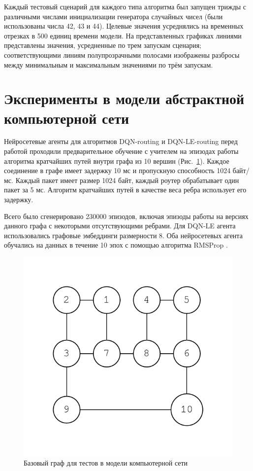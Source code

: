 \documentclass[specification,annotation,times]{itmo-student-thesis}
\theoremstyle{definition}
\begin{document}
Каждый тестовый сценарий для каждого типа алгоритма был запущен трижды с
различными числами инициализации генератора случайных чисел (были использованы
числа 42, 43 и 44). Целевые значения усреднялись на временных отрезках в 500
единиц времени модели. На представленных графиках линиями представлены значения,
усредненные по трем запускам сценария; соответствующими линиям полупрозрачными
полосами изображены разбросы между минимальным и максимальным значениями по трём
запускам.

\section{Эксперименты в модели абстрактной компьютерной сети}\label{experiments:network}

Нейросетевые агенты для алгоритмов DQN-routing и DQN-LE-routing перед работой
проходили предварительное обучение с учителем на эпизодах работы алгоритма
кратчайших путей внутри графа из 10 вершин (Рис.~\ref{fig-simple-network}).
Каждое соединение в графе имеет задержку 10 мс и пропускную способность 1024 байт/мс.
Каждый пакет имеет размер 1024 байт, каждый роутер обрабатывает один пакет за 5
мс. Алгоритм кратчайших путей в качестве веса ребра использует его задержку.

Всего было сгенерировано 230000 эпизодов, включая эпизоды работы на версиях
данного графа с некоторыми отсутствующими ребрами. Для DQN-LE агента
использовались графовые эмбеддинги размерности 8. Оба нейросетевых агента
обучались на данных в течение 10 эпох с помощью алгоритма RMSProp \cite{tieleman2012lecture}.

\begin{figure}[!h]
  \caption{Базовый граф для тестов в модели компьютерной сети}\label{fig-simple-network}
  \centering
  \includegraphics[scale=0.6]{graph-2.pdf}
\end{figure}
\end{document}
